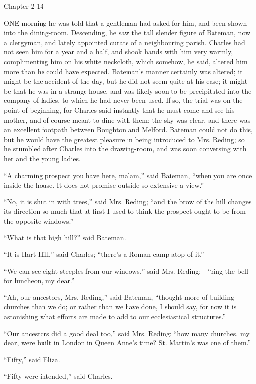 Chapter 2-14


ONE morning he was told that a
gentleman had asked for him, and been shown into the dining-room.
Descending, he saw the tall slender figure of Bateman, now a
clergyman, and lately appointed curate of a neighbouring parish.
Charles had not seen him for a year and a half, and shook hands with
him very warmly, complimenting him on his white neckcloth, which
somehow, he said, altered him more than he could have expected.
Bateman's manner certainly was altered; it might be the accident of
the day, but he did not seem quite at his ease; it might be that he
was in a strange house, and was likely soon to be precipitated into
the company of ladies, to which he had never been used. If so, the
trial was on the point of beginning, for Charles said instantly that
he must come and see his mother, and of course meant to dine with
them; the sky was clear, and there was an excellent footpath between
Boughton and Melford. Bateman could not do this, but he would have the
greatest pleasure in being introduced to Mrs. Reding; so he stumbled
after Charles into the drawing-room, and was soon conversing with her
and the young ladies.

``A charming prospect you have here, ma'am,'' said Bateman,
``when you are once inside the house. It does not promise outside
so extensive a view.''

``No, it is shut in with trees,'' said Mrs. Reding;
``and the brow of the hill changes its direction so much that at
first I used to think the prospect ought to be from the opposite
windows.''

``What is that high hill?'' said Bateman.

``It is Hart Hill,'' said Charles; ``there's a Roman
camp atop of it.''

``We can see eight steeples from our windows,'' said Mrs.
Reding;—``ring the bell for luncheon, my dear.''

``Ah, our ancestors, Mrs. Reding,'' said Bateman,
``thought more of building churches than we do; or rather than we
have done, I should say, for now it is astonishing what efforts are
made to add to our ecclesiastical structures.''

``Our ancestors did a good deal too,'' said Mrs. Reding;
``how many churches, my dear, were built in London in Queen Anne's
time? St. Martin's was one of them.''

``Fifty,'' said Eliza.

``Fifty were intended,'' said Charles.


